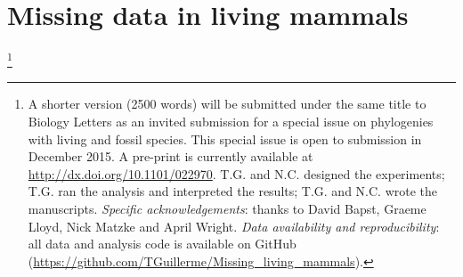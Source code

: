 

%
%

\chapter[Missing data in living mammals]{Missing data in living mammals}
\label{chap:missing_mammals}

\bigskip
\medskip
\begin{center}

\footnote{A shorter version (2500 words) will be submitted under the same title to Biology Letters as an invited submission for a special issue on phylogenies with living and fossil species. This special issue is open to submission in December 2015. A pre-print is currently available at \url{http://dx.doi.org/10.1101/022970}. T.G. and N.C. designed the experiments; T.G. ran the analysis and interpreted the results; T.G. and N.C. wrote the manuscripts. \textit{Specific acknowledgements}: thanks to David Bapst, Graeme Lloyd, Nick Matzke and April Wright. \textit{Data availability and reproducibility}: all data and analysis code is available on GitHub (\url{https://github.com/TGuillerme/Missing_living_mammals}).} \\

\end{center}
%
%


